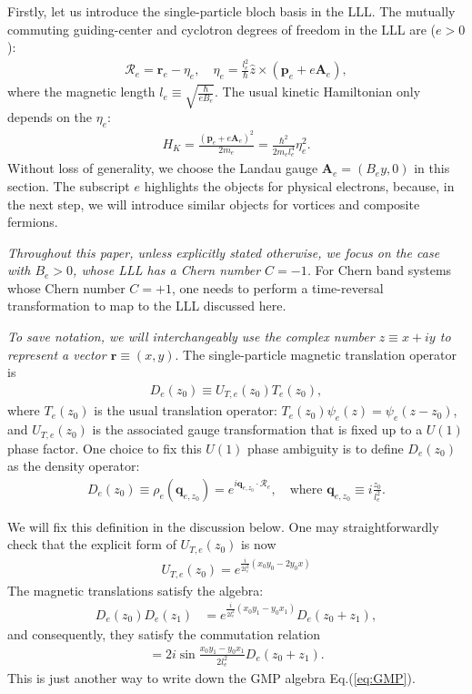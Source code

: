 Firstly, let us introduce the single-particle bloch basis in the LLL. The mutually commuting guiding-center and cyclotron degrees of freedom in the LLL are ($e>0$):
\begin{align}
    \mathcal R_e=\bm r_e-\eta_e, \quad \eta_e=\frac{l_e^2}{\hbar}\hat z\times (\mathbf p_e+e\mathbf A_e),
\end{align}
where the magnetic length $l_e\equiv \sqrt{\frac{\hbar}{eB_e}}$. The usual kinetic Hamiltonian only depends on the $\eta_e$:
\begin{align}
    H_K= \frac{(\mathbf p_e+e\mathbf A_e)^2}{2m_e}=\frac{\hbar^2}{2m_e l_e^4}\eta_e^2.
\end{align}
Without loss of generality, we choose the Landau gauge $\mathbf A_e=(B_e y,0)$ in this section. The subscript $e$ highlights the objects for physical electrons, because, in the next step, we will introduce similar objects for vortices and composite fermions.

\emph{Throughout this paper, unless explicitly stated otherwise, we focus on the case with $B_e>0$, whose LLL has a Chern number $C=-1$.} For Chern band systems whose Chern number $C=+1$, one needs to perform a time-reversal transformation to map to the LLL discussed here.

\emph{To save notation, we will interchangeably use the complex number $z\equiv x+iy$ to represent a vector $\bm r\equiv(x,y)$}. The single-particle magnetic translation operator is
\begin{align}
    D_e(z_0)\equiv U_{T,e}(z_0)T_e(z_0),
\end{align}
where $T_e(z_0)$ is the usual translation operator: $T_e(z_0)\psi_e(z)=\psi_e(z-z_0)$, and $U_{T,e}(z_0)$ is the associated gauge transformation that is fixed up to a $U(1)$ phase factor. One choice to fix this $U(1)$ phase ambiguity is to define $D_e(z_0)$ as the density operator:
\begin{align}
    D_e(z_0)\equiv\rho_e(\mathbf q_{e, z_0})=e^{i \mathbf q_{e, z_0} \cdot \mathcal R_e}, \quad\text{where }\mathbf q_{e, z_0}\equiv i\frac{z_0}{l_e^2}.\label{eq:real_momentum}
\end{align}

We will fix this definition in the discussion below. One may straightforwardly check that the explicit form of $U_{T,e}(z_0)$ is now
\begin{align}
    U_{T,e}(z_0)=e^{\frac{i}{2l_e^2}(x_0y_0-2y_0 x)}\label{eq:U_T}
\end{align}
The magnetic translations satisfy the algebra:
\begin{align}
    D_e(z_0)D_e(z_1) & =e^{\frac{i}{2l_e^2}(x_0 y_1-y_0 x_1)}D_e(z_0+z_1),
\end{align}
and consequently, they satisfy the commutation relation
\begin{align}
    [D_e(z_0),D_e(z_1)]=2i\sin\frac{x_0 y_1-y_0 x_1}{2l_e^2} D_e(z_0+z_1).
\end{align}
This is just another way to write down the GMP algebra Eq.(\ref{eq:GMP}).

